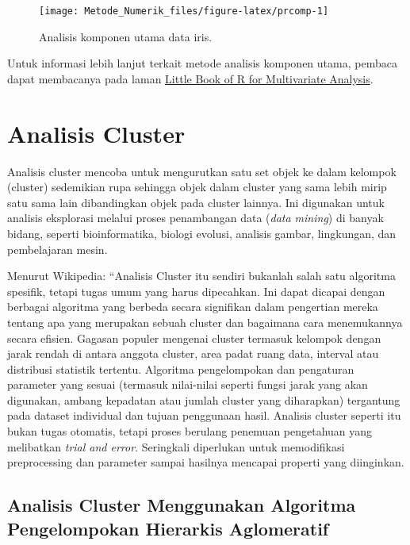 \documentclass[
]{book}
\theoremstyle{definition}
\theoremstyle{definition}
\theoremstyle{definition}
\theoremstyle{definition}
\theoremstyle{remark}
\begin{document}
\begin{figure}

{\centering \texttt{[image: Metode\_Numerik\_files/figure-latex/prcomp-1]} 

}

\caption{Analisis komponen utama data iris.}\label{fig:prcomp}
\end{figure}

Untuk informasi lebih lanjut terkait metode analisis komponen utama, pembaca dapat membacanya pada laman \href{https://little-book-of-r-for-multivariate-analysis.readthedocs.io/en/latest/}{Little Book of R for Multivariate Analysis}.

\hypertarget{analisis-cluster}{%
\section{Analisis Cluster}\label{analisis-cluster}}

Analisis cluster mencoba untuk mengurutkan satu set objek ke dalam kelompok (cluster) sedemikian rupa sehingga objek dalam cluster yang sama lebih mirip satu sama lain dibandingkan objek pada cluster lainnya. Ini digunakan untuk analisis eksplorasi melalui proses penambangan data (\emph{data mining}) di banyak bidang, seperti bioinformatika, biologi evolusi, analisis gambar, lingkungan, dan pembelajaran mesin.

Menurut Wikipedia: ``Analisis Cluster itu sendiri bukanlah salah satu algoritma spesifik, tetapi tugas umum yang harus dipecahkan. Ini dapat dicapai dengan berbagai algoritma yang berbeda secara signifikan dalam pengertian mereka tentang apa yang merupakan sebuah cluster dan bagaimana cara menemukannya secara efisien. Gagasan populer mengenai cluster termasuk kelompok dengan jarak rendah di antara anggota cluster, area padat ruang data, interval atau distribusi statistik tertentu. Algoritma pengelompokan dan pengaturan parameter yang sesuai (termasuk nilai-nilai seperti fungsi jarak yang akan digunakan, ambang kepadatan atau jumlah cluster yang diharapkan) tergantung pada dataset individual dan tujuan penggunaan hasil. Analisis cluster seperti itu bukan tugas otomatis, tetapi proses berulang penemuan pengetahuan yang melibatkan \emph{trial and error}. Seringkali diperlukan untuk memodifikasi preprocessing dan parameter sampai hasilnya mencapai properti yang diinginkan.

\hypertarget{analisis-cluster-menggunakan-algoritma-pengelompokan-hierarkis-aglomeratif}{%
\subsection{Analisis Cluster Menggunakan Algoritma Pengelompokan Hierarkis Aglomeratif}\label{analisis-cluster-menggunakan-algoritma-pengelompokan-hierarkis-aglomeratif}}
\end{document}

